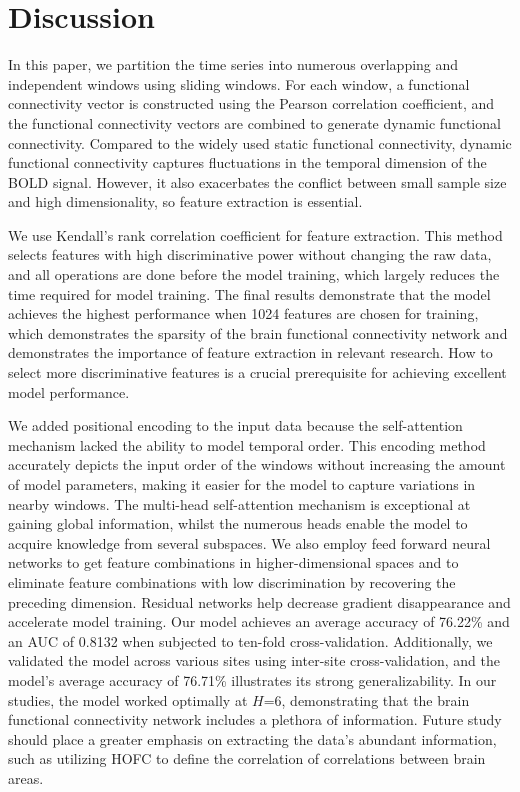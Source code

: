 \documentclass[a4paper]{cas-dc}
\begin{document}
\section{Discussion}
In this paper, we partition the time series into numerous overlapping and independent windows using sliding windows. For each window, a functional connectivity vector is constructed using the Pearson correlation coefficient, and the functional connectivity vectors are combined to generate dynamic functional connectivity. Compared to the widely used static functional connectivity, dynamic functional connectivity captures fluctuations in the temporal dimension of the BOLD signal. However, it also exacerbates the conflict between small sample size and high dimensionality, so feature extraction is essential.

We use Kendall's rank correlation coefficient for feature extraction. This method selects features with high discriminative power without changing the raw data, and all operations are done before the model training, which largely reduces the time required for model training. The final results demonstrate that the model achieves the highest performance when 1024 features are chosen for training, which demonstrates the sparsity of the brain functional connectivity network and demonstrates the importance of feature extraction in relevant research. How to select more discriminative features is a crucial prerequisite for achieving excellent model performance.

We added positional encoding to the input data because the self-attention mechanism lacked the ability to model temporal order. This encoding method accurately depicts the input order of the windows without increasing the amount of model parameters, making it easier for the model to capture variations in nearby windows. The multi-head self-attention mechanism is exceptional at gaining global information, whilst the numerous heads enable the model to acquire knowledge from several subspaces. We also employ feed forward neural networks to get feature combinations in higher-dimensional spaces and to eliminate feature combinations with low discrimination by recovering the preceding dimension. Residual networks help decrease gradient disappearance and accelerate model training. Our model achieves an average accuracy of 76.22\% and an AUC of 0.8132 when subjected to ten-fold cross-validation. Additionally, we validated the model across various sites using inter-site cross-validation, and the model's average accuracy of 76.71\% illustrates its strong generalizability. In our studies, the model worked optimally at $H$=6, demonstrating that the brain functional connectivity network includes a plethora of information. Future study should place a greater emphasis on extracting the data's abundant information, such as utilizing HOFC to define the correlation of correlations between brain areas.
\end{document}
